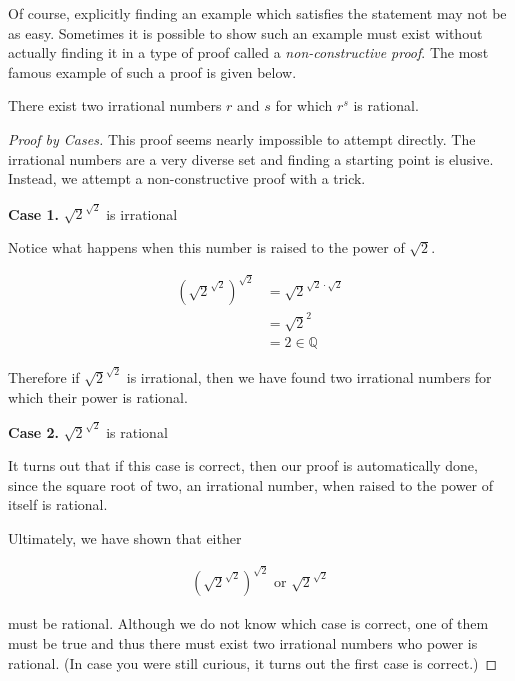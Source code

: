 \documentclass[twoside]{report}
\newcommand{\header}[2]{\begin{flushright} \textbf{#1} #2 \end{flushright}}
\begin{document}
Of course, explicitly finding an example which satisfies the statement may not be as easy. Sometimes it is possible to show such an example must exist without actually finding it in a type of proof called a \emph{non-constructive proof}.  The most famous example of such a proof is given below.

\vspace{\baselineskip}
\begin{theorem}
	There exist two irrational numbers $r$ and $s$ for which $r^s$ is rational.
\end{theorem}

\begin{proof}[Proof by Cases]
	This proof seems nearly impossible to attempt directly. The irrational numbers are a very diverse set and finding a starting point is elusive. Instead, we attempt a non-constructive proof with a trick.
	
	\header{Case 1. }{$\sqrt{2}^{\sqrt{2}}$ is irrational}
	Notice what happens when this number is raised to the power of $\sqrt{2}$.
	
	\begin{align*}
		\left( \sqrt{2}^{\sqrt{2}} \right)^{\sqrt{2}} &= \sqrt{2}^{\sqrt{2} \cdot \sqrt{2}} \\
		&= \sqrt{2}^2 \\
		&= 2 \in \mathbb{Q}
	\end{align*}
	
	Therefore if $\sqrt{2}^{\sqrt{2}}$ is irrational, then we have found two irrational numbers for which their power is rational.
	
	\header{Case 2. }{$\sqrt{2}^{\sqrt{2}}$ is rational}
	
	It turns out that if this case is correct, then our proof is automatically done, since the square root of two, an irrational number, when raised to the power of itself is rational.
	
	Ultimately, we have shown that either
	
	\begin{align*}
		\left( \sqrt{2}^{\sqrt{2}} \right)^{\sqrt{2}} \text{ or } \sqrt{2}^{\sqrt{2}}
	\end{align*}
	
	must be rational. Although we do not know which case is correct, one of them must be true and thus there must exist two irrational numbers who power is rational. (In case you were still curious, it turns out the first case is correct.)
\end{proof}
\vspace{\baselineskip}
\end{document}
